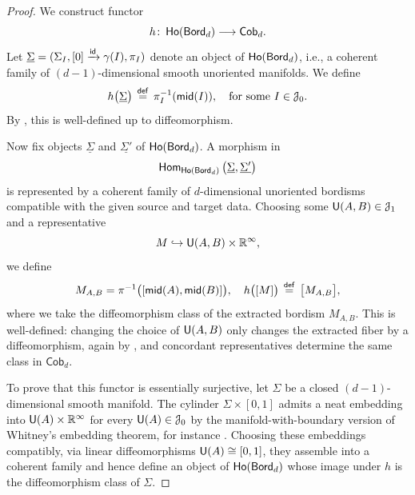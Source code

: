 \begin{proof}
    We construct functor 
    \begin{equation}
        h \colon \operatorname{\sf Ho}(\operatorname{\mathsf{Bord}}_d) \longrightarrow \mathsf{Cob}_d.
    \end{equation}
    Let $\underline{\Sigma} = (\Sigma_{I}, [0] \xrightarrow{\operatorname{\sf id}} \gamma(I),\pi_{I})$ denote an object of $\operatorname{\sf Ho}(\operatorname{\mathsf{Bord}}_d)$, i.e., a coherent family of $(d-1)$-dimensional smooth unoriented manifolds. We define
    \begin{equation}
        h \big(\underline{\Sigma}\big) \, \overset{\mathsf{def}}{=} \, \pi_{I}^{-1}(\mathsf{mid}(I)), \quad \text{for some } I\in \mathcal J_0.
    \end{equation}
    By , this is well-defined up to diffeomorphism.

    Now fix objects $\underline{\Sigma}$ and $\underline{\Sigma'}$ of $\operatorname{\sf Ho}(\operatorname{\mathsf{Bord}}_d)$. A morphism in
    \[
        \operatorname{\sf Hom}_{\operatorname{\sf Ho}(\operatorname{\mathsf{Bord}}_d)}\big(\underline{\Sigma},\underline{\Sigma'}\big)
    \]
    is represented by a coherent family of $d$-dimensional unoriented bordisms compatible with the given source and target data. Choosing some $\mathsf U(A,B)\in \mathcal J_1$ and a representative
    \[
        M \hookrightarrow \mathsf U(A,B)\times \mathbb R^{\operatorname{\infty}},
    \]
    we define
    \begin{equation}
        M_{A,B} = \pi^{-1}\big([\mathsf{mid}(A),\mathsf{mid}(B)]\big), \quad h\big([M]\big) \, \overset{\sf def}{=} \, \big[M_{A,B}\big],
    \end{equation}
    where we take the diffeomorphism class of the extracted bordism $M_{A,B}$. This is well-defined: changing the choice of $\mathsf U(A,B)$ only changes the extracted fiber by a diffeomorphism, again by , and concordant representatives determine the same class in $\mathsf{Cob}_d$.

    \medskip

    To prove that this functor is essentially surjective, let $\Sigma$ be a closed $(d-1)$-dimensional smooth manifold. The cylinder $\Sigma\times [0,1]$ admits a neat embedding into $\mathsf U(A)\times \mathbb R^{\operatorname{\infty}}$ for every $\mathsf U(A)\in \mathcal J_{0}$ by the manifold-with-boundary version of Whitney's embedding theorem, for instance \cite[Theorem 8.9]{CS19}. Choosing these embeddings compatibly, via linear diffeomorphisms $\mathsf U(A)\cong [0,1]$, they assemble into a coherent family and hence define an object of $\operatorname{\sf Ho}(\operatorname{\mathsf{Bord}}_d)$ whose image under $h$ is the diffeomorphism class of $\Sigma$.

    \medskip
    

\end{proof}
